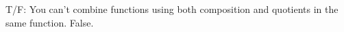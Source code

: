 {T/F: You can't combine functions using both composition and quotients in the same function.}
{False.}
